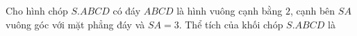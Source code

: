 \begin{ex}
Cho hình chóp $S.ABCD$ có đáy $ABCD$ là hình vuông cạnh bằng $2$, cạnh bên $SA$ vuông góc với mặt phẳng đáy và $SA=3$. Thể tích của khối chóp $S.ABCD$ là
\end{ex}
